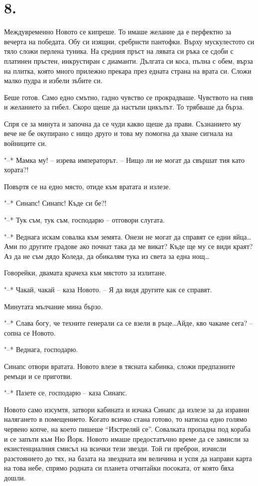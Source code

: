 \documentclass[ebook,openany,12pt]{memoir}
\begin{document}
\section*{8.}

Междувременно Новото се кипреше. То имаше желание да е перфектно за вечерта на победата. Обу си изящни, сребристи пантофки. Върху мускулестото си тяло сложи перлена туника. На средния пръст на лявата си ръка се сдоби с платинен пръстен, инкрустиран с диаманти. Дългата си коса, пълна с обем, върза на плитка, която много прилежно прекара през едната страна на врата си. Сложи малко пудра и избели зъбите си.

Беше готов. Само едно смътно, гадно чувство се прокрадваше. Чувството на гняв и желанието за гибел. Скоро щеше да настъпи цикълът. То трябваше да бърза.

Спря се за минута и започна да се чуди какво щеше да прави. Съзнанието му вече не бе окупирано с нищо друго и това му помогна да хване сигнала на войниците си.

"--* Мамка му! – изрева императорът. – Нищо ли не могат да свършат тия като хората?!

Повъртя се на едно място, отиде към вратата и излезе.

"--* Синапс! Синапс! Къде си бе?!

"--* Тук съм, тук съм, господарю – отговори слугата.

"--* Веднага искам совалка към земята. Онези не могат да справят се едни яйца\ldots Ами по другите градове ако почнат така да ме викат? Къде ще му се види краят? Аз да не съм дядо Коледа, да обикалям тука из света за една нощ\ldots

Говорейки, двамата крачеха към мястото за излитане.

"--* Чакай, чакай – каза Новото. – Я да видя другите как се справят.

Минутата мълчание мина бързо.

"--* Слава богу, че техните генерали са се взели в ръце\ldots Айде, кво чакаме сега? – сопна се Новото.

"--* Веднага, господарю.

Синапс отвори вратата. Новото влезе в тясната кабинка, сложи предпазните ремъци и се приготви.

"--* Пазете се, господарю – каза Синапс.

Новото само изсумтя, затвори кабината и изчака Синапс да излезе за да изравни налягането в помещението. Когато всичко стана готово, то натисна едно голямо червено копче, на което пишеше ``Изстреляй се''. Совалката пропадна под кораба и се запъти към Ню Йорк. Новото имаше предостатъчно време да се замисли за екзистенциалния смисъл на всички тези звезди. Той ги преброи, изчисли разстоянието до тях, на базата на звездната им величина и успя да направи карта на това небе, спрямо родната си планета отчитайки посоката, от която бяха дошли.
\end{document}

